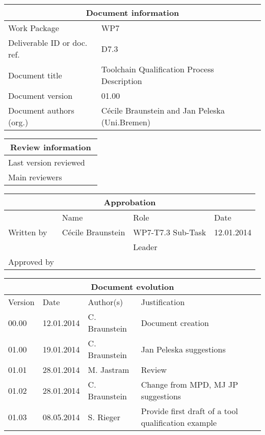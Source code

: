 \documentclass{openetcs_report}
\begin{document}
\begin{tabular}{|p{4.4cm}|p{8.7cm}|}
\hline
\multicolumn{2}{|c|}{Document information} \\
\hline
Work Package &  WP7  \\
Deliverable ID or doc. ref. & D7.3\\
\hline
Document title & Toolchain Qualification Process Description \\
Document version & 01.00 \\
Document authors (org.)  & Cécile Braunstein and Jan Peleska (Uni.Bremen) \\
\hline
\end{tabular}

\begin{tabular}{|p{4.4cm}|p{8.7cm}|}
\hline
\multicolumn{2}{|c|}{Review information} \\
\hline
Last version reviewed &  \\
\hline
Main reviewers &  \\
\hline
\end{tabular}

\begin{tabular}{|p{2.2cm}|p{4cm}|p{4cm}|p{2cm}|}
\hline
\multicolumn{4}{|c|}{Approbation} \\
\hline
  &  Name & Role & Date   \\
\hline  
Written by    &  Cécile Braunstein & WP7-T7.3 Sub-Task  & 12.01.2014 \\
&  & Leader&\\
\hline
Approved by &  &   &  \\
\hline
\end{tabular}

\begin{tabular}{|p{2.2cm}|p{2cm}|p{3cm}|p{5cm}|}
\hline
\multicolumn{4}{|c|}{Document evolution} \\
\hline
Version &  Date & Author(s) & Justification  \\
\hline  
00.00 & 12.01.2014 & C. Braunstein  &  Document creation  \\
01.00 & 19.01.2014 & C. Braunstein  &  Jan Peleska suggestions \\
01.01 & 28.01.2014 & M. Jastram  &  Review \\
01.02 & 28.01.2014 &  C. Braunstein &  Change from MPD, MJ JP suggestions \\
01.03 & 08.05.2014 &  S. Rieger &  Provide first draft of a tool qualification example \\


\hline  
\end{tabular}
\newpage
\end{document}
